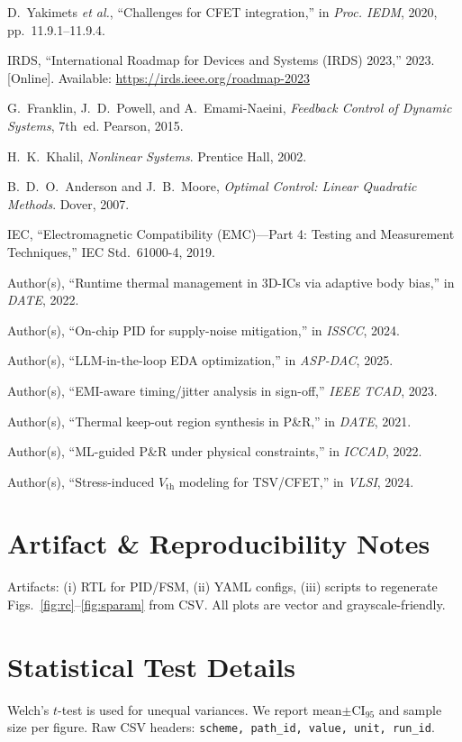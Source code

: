 \documentclass[conference]{IEEEtran}
\newcommand{\etal}{\textit{et al.}}
\newcommand{\CI}{\mathrm{CI}_{95}}
\begin{document}
\begin{thebibliography}{99}

D.~Yakimets \etal, ``Challenges for CFET integration,'' in \emph{Proc. IEDM}, 2020, pp.~11.9.1--11.9.4.

IRDS, ``International Roadmap for Devices and Systems (IRDS) 2023,'' 2023. [Online]. Available: \url{https://irds.ieee.org/roadmap-2023}

G.~Franklin, J.~D.~Powell, and A.~Emami-Naeini, \emph{Feedback Control of Dynamic Systems}, 7th~ed. Pearson, 2015.

H.~K.~Khalil, \emph{Nonlinear Systems}. Prentice Hall, 2002.

B.~D.~O.~Anderson and J.~B.~Moore, \emph{Optimal Control: Linear Quadratic Methods}. Dover, 2007.

IEC, ``Electromagnetic Compatibility (EMC)---Part 4: Testing and Measurement Techniques,'' IEC Std.~61000-4, 2019.

Author(s), ``Runtime thermal management in 3D-ICs via adaptive body bias,'' in \emph{DATE}, 2022.

Author(s), ``On-chip PID for supply-noise mitigation,'' in \emph{ISSCC}, 2024.

Author(s), ``LLM-in-the-loop EDA optimization,'' in \emph{ASP-DAC}, 2025.

Author(s), ``EMI-aware timing/jitter analysis in sign-off,'' \emph{IEEE TCAD}, 2023.

Author(s), ``Thermal keep-out region synthesis in P\&R,'' in \emph{DATE}, 2021.

Author(s), ``ML-guided P\&R under physical constraints,'' in \emph{ICCAD}, 2022.

Author(s), ``Stress-induced $V_{\mathrm{th}}$ modeling for TSV/CFET,'' in \emph{VLSI}, 2024.

\end{thebibliography}

\appendices
\section{Artifact \& Reproducibility Notes}
Artifacts: (i) RTL for PID/FSM, (ii) YAML configs, (iii) scripts to regenerate Figs.~\ref{fig:rc}--\ref{fig:sparam} from CSV. All plots are vector and grayscale-friendly.

\section{Statistical Test Details}
Welch's $t$-test is used for unequal variances. We report mean$\pm\CI$ and sample size per figure. Raw CSV headers: \texttt{scheme, path\_id, value, unit, run\_id}.
\end{document}
